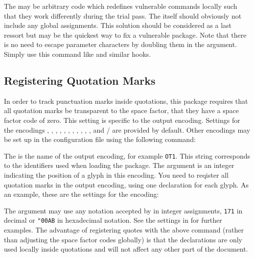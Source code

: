 \documentclass{ltxdockit}[2010/09/26]
\begin{document}
\begin{ltxsyntax}


The  may be arbitrary \latex code which redefines vulnerable commands locally such that they work differently during the trial pass. The  itself should obviously not include any global assignments. This solution should be considered as a last ressort but may be the quickest way to fix a vulnerable package. Note that there is no need to escape parameter characters by doubling them in the  argument. Simply use this command like  and similar hooks.

\end{ltxsyntax}

\subsection{Registering Quotation Marks}
\label{aut:sfc}

In order to track punctuation marks inside quotations, this package requires that all quotation marks be transparent to the space factor, \ie that they have a space factor code of zero. This setting is specific to the output encoding. Settings for the encodings , , , , , , , , , , , and \slash {} are provided by default. Other encodings may be set up in the configuration file using the following command:

\begin{ltxsyntax}
\end{ltxsyntax}

The  is the name of the output encoding, for example \texttt{OT1}. This string corresponds to the identifiers used when loading the  package. The  argument is an integer indicating the position of a glyph in this encoding. You need to reqister all quotation marks in the output encoding, using one declaration for each glyph. As an example, these are the settings for the  encoding:

\begin{ltxcode}
{}%
{}%
{}%
\end{ltxcode}
%
The  argument may use any notation accepted by \tex in integer assignments, \eg \texttt{171} in decimal or \verb+"00AB+ in hexadecimal notation. See the settings in  for further examples. The advantage of registering quotes with the above command (rather than adjusting the space factor codes globally) is that the declarations are only used locally inside quotations and will not affect any other part of the document.
\end{document}
